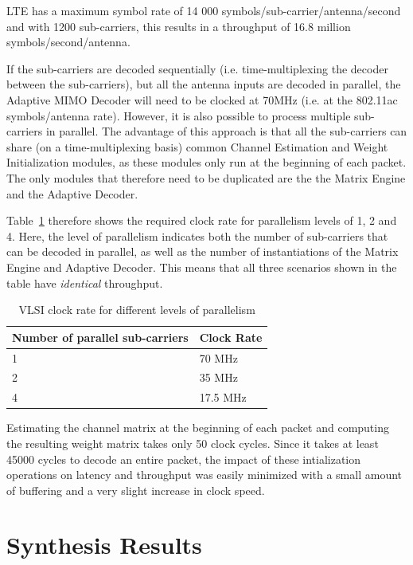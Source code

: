 \documentclass[journal]{IEEEtran}
\begin{document}
LTE has a maximum symbol rate of 14 000 symbols/sub-carrier/antenna/second \cite{lte_webpage} and with 1200 sub-carriers, this results in a throughput of 16.8 million symbols/second/antenna.

If the sub-carriers are decoded sequentially (i.e. time-multiplexing the decoder between the sub-carriers), but all the antenna inputs are decoded in parallel, the Adaptive MIMO Decoder will need to be clocked at 70MHz (i.e. at the 802.11ac symbols/antenna rate). However, it is also possible to process multiple sub-carriers in parallel. The advantage of this approach is that all the sub-carriers can share (on a time-multiplexing basis) common Channel Estimation and Weight Initialization modules, as these modules only run at the beginning of each packet. The only modules that therefore need to be duplicated are the the Matrix Engine and the Adaptive Decoder.

Table~\ref{clock_rate_table} therefore shows the required clock rate for parallelism levels of 1, 2 and 4. Here, the level of parallelism indicates both the number of sub-carriers that can be decoded in parallel, as well as the number of instantiations of the Matrix Engine and Adaptive Decoder. This means that all three scenarios shown in the table have {\em identical} throughput.

\begin{table}[!h]
\caption{VLSI clock rate for different levels of parallelism}
\label{clock_rate_table}
\centering
\begin{tabular}{l l}
\hline
Number of parallel sub-carriers & Clock Rate \\
\hline
1 & 70 MHz \\
2 & 35 MHz \\
4 & 17.5 MHz \\
\hline
\end{tabular}
\end{table}

Estimating the channel matrix at the beginning of each packet and computing the resulting weight matrix takes only 50 clock cycles. Since it takes at least 45000 cycles to decode an entire packet, the impact of these intialization operations on latency and throughput was easily minimized with a small amount of buffering and a very slight increase in clock speed.


\section{Synthesis Results}
\end{document}

